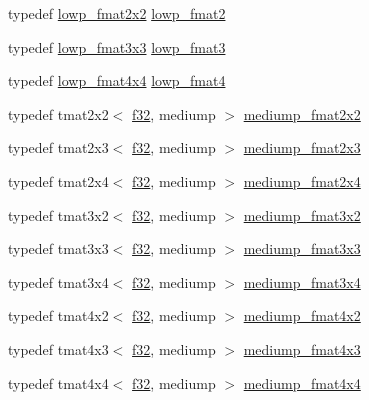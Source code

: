 \begin{DoxyCompactItemize}
\item 
typedef \hyperlink{namespaceglm_aa860329771ca51dbaa48cf16a1ecfc34}{lowp\+\_\+fmat2x2} \hyperlink{namespaceglm_a9bafb192cb7327d543ad55be2e6e675c}{lowp\+\_\+fmat2}
\item 
typedef \hyperlink{namespaceglm_a768d23520c7658624b9f212324ae8db0}{lowp\+\_\+fmat3x3} \hyperlink{namespaceglm_a88ae00cab6aae48d56700915c7799973}{lowp\+\_\+fmat3}
\item 
typedef \hyperlink{namespaceglm_ac924479e50d7a275061807b2774a5d28}{lowp\+\_\+fmat4x4} \hyperlink{namespaceglm_a00dfb85ec53bb5f173747f73d13c1b8b}{lowp\+\_\+fmat4}
\item 
typedef tmat2x2$<$ \hyperlink{group__gtc__type__precision_ga0ec999b57f5330d9021256e96038df04}{f32}, mediump $>$ \hyperlink{namespaceglm_a933dc07be88e05bf16cd823e99abf860}{mediump\+\_\+fmat2x2}
\item 
typedef tmat2x3$<$ \hyperlink{group__gtc__type__precision_ga0ec999b57f5330d9021256e96038df04}{f32}, mediump $>$ \hyperlink{namespaceglm_a96eb5212b42c69eb09c0efc057fab4a1}{mediump\+\_\+fmat2x3}
\item 
typedef tmat2x4$<$ \hyperlink{group__gtc__type__precision_ga0ec999b57f5330d9021256e96038df04}{f32}, mediump $>$ \hyperlink{namespaceglm_ade60eec42074540e68aa7dcbcb4a25f1}{mediump\+\_\+fmat2x4}
\item 
typedef tmat3x2$<$ \hyperlink{group__gtc__type__precision_ga0ec999b57f5330d9021256e96038df04}{f32}, mediump $>$ \hyperlink{namespaceglm_ade4cf6efa8cec2545fc5c7ee25919a3d}{mediump\+\_\+fmat3x2}
\item 
typedef tmat3x3$<$ \hyperlink{group__gtc__type__precision_ga0ec999b57f5330d9021256e96038df04}{f32}, mediump $>$ \hyperlink{namespaceglm_a7719af89d88d87c3b60d7c9f06801711}{mediump\+\_\+fmat3x3}
\item 
typedef tmat3x4$<$ \hyperlink{group__gtc__type__precision_ga0ec999b57f5330d9021256e96038df04}{f32}, mediump $>$ \hyperlink{namespaceglm_a02c8a6eb751559f13a412467d2241c6e}{mediump\+\_\+fmat3x4}
\item 
typedef tmat4x2$<$ \hyperlink{group__gtc__type__precision_ga0ec999b57f5330d9021256e96038df04}{f32}, mediump $>$ \hyperlink{namespaceglm_ace18973339f3a369fc0413698ab88e2e}{mediump\+\_\+fmat4x2}
\item 
typedef tmat4x3$<$ \hyperlink{group__gtc__type__precision_ga0ec999b57f5330d9021256e96038df04}{f32}, mediump $>$ \hyperlink{namespaceglm_ab86c2897e2958d40f3eac9cd5db9a172}{mediump\+\_\+fmat4x3}
\item 
typedef tmat4x4$<$ \hyperlink{group__gtc__type__precision_ga0ec999b57f5330d9021256e96038df04}{f32}, mediump $>$ \hyperlink{namespaceglm_ad4ee0ec08503fbbad983bb70cb91d15e}{mediump\+\_\+fmat4x4}

\end{DoxyCompactItemize}
